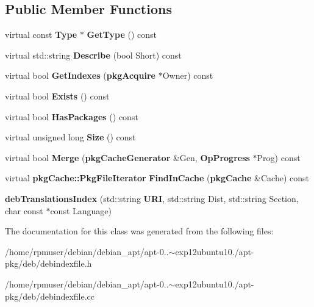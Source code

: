 \subsection*{\-Public \-Member \-Functions}
\begin{DoxyCompactItemize}
\item 
virtual const {\bf \-Type} $\ast$ {\bfseries \-Get\-Type} () const \label{classdebTranslationsIndex_a97e9791ce2bb129d7b03dfe2f55de366}

\item 
virtual std\-::string {\bfseries \-Describe} (bool \-Short) const \label{classdebTranslationsIndex_a1d76db0d4174d2926a4c5af85e1019d9}

\item 
virtual bool {\bfseries \-Get\-Indexes} ({\bf pkg\-Acquire} $\ast$\-Owner) const \label{classdebTranslationsIndex_a64ea3b4afff26cc8c99ac384788b4bb8}

\item 
virtual bool {\bfseries \-Exists} () const \label{classdebTranslationsIndex_aa746a17c5bebccb81d72dccb29948ec4}

\item 
virtual bool {\bfseries \-Has\-Packages} () const \label{classdebTranslationsIndex_a29ebd46dc004b08bed75df38862c6caa}

\item 
virtual unsigned long {\bfseries \-Size} () const \label{classdebTranslationsIndex_ab1050fe2604ef4e6cba6491de8a9f708}

\item 
virtual bool {\bfseries \-Merge} ({\bf pkg\-Cache\-Generator} \&\-Gen, {\bf \-Op\-Progress} $\ast$\-Prog) const \label{classdebTranslationsIndex_a7055ce0e05b5bcf6fad25971d5e3c9e4}

\item 
virtual {\bf pkg\-Cache\-::\-Pkg\-File\-Iterator} {\bfseries \-Find\-In\-Cache} ({\bf pkg\-Cache} \&\-Cache) const \label{classdebTranslationsIndex_afa0e20f879d9090dac2a7a4830bc7015}

\item 
{\bfseries deb\-Translations\-Index} (std\-::string {\bf \-U\-R\-I}, std\-::string \-Dist, std\-::string \-Section, char const $\ast$const \-Language)\label{classdebTranslationsIndex_a06f09f55991c66b5d420b1a51673be5c}

\end{DoxyCompactItemize}


\-The documentation for this class was generated from the following files\-:\begin{DoxyCompactItemize}
\item 
/home/rpmuser/debian/debian\-\_\-apt/apt-\/0..$\sim$exp12ubuntu10./apt-\/pkg/deb/debindexfile.\-h\item 
/home/rpmuser/debian/debian\-\_\-apt/apt-\/0..$\sim$exp12ubuntu10./apt-\/pkg/deb/debindexfile.\-cc\end{DoxyCompactItemize}
